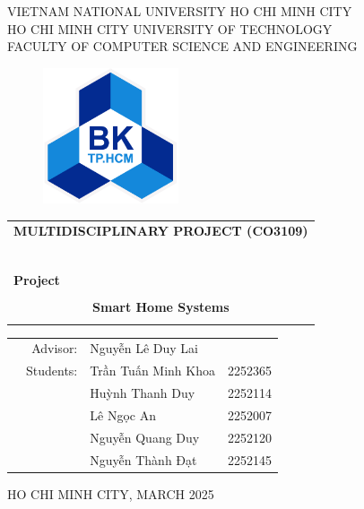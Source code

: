\begin{titlepage}
\begin{center}
VIETNAM NATIONAL UNIVERSITY HO CHI MINH CITY  \\
HO CHI MINH CITY UNIVERSITY OF TECHNOLOGY\\
FACULTY OF COMPUTER SCIENCE AND ENGINEERING
\end{center}

\begin{figure}[h!]
\begin{center}
\includegraphics[width=4cm]{Images/bachkhoa_logo.png}
\end{center}
\end{figure}

\begin{center}
\begin{tabular}{c}
\multicolumn{1}{l}{\textbf{{\LARGE MULTIDISCIPLINARY PROJECT (CO3109)}}}\\
~~\\
\hline
\\
\multicolumn{1}{l}{\textbf{{\LARGE Project}}}\\
\\
\textbf{{\Huge Smart Home Systems}}\\
\\
\hline
\end{tabular}
\end{center}

\vspace{2cm}

\begin{table}[h]
\begin{tabular}{rrll}

\hspace{5 cm} & Advisor: & Nguyễn Lê Duy Lai&\\

& Students:&  
 	
    Trần Tuấn Minh Khoa& 2252365\\
& & Huỳnh Thanh Duy& 2252114\\
& & Lê Ngọc An& 2252007\\
& & Nguyễn Quang Duy& 2252120\\
 & & Nguyễn Thành Đạt&2252145\\

\end{tabular}
\end{table}

\vspace{3cm}

\begin{center}
{\footnotesize HO CHI MINH CITY, MARCH 2025}
\end{center}

\end{titlepage}


